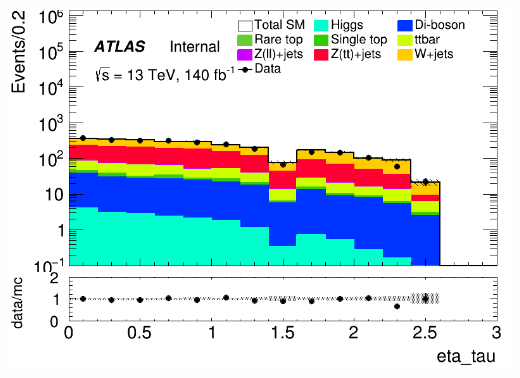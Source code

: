 \documentclass[usenames,dvipsnames]{beamer}
\begin{document}
\begin{frame}
\begin{minipage}{0.32\textwidth}
        \includegraphics[width=\textwidth]{graphics/H_met/H_met_eta_tau.png}
    \end{minipage}
\end{frame}
\end{document}
